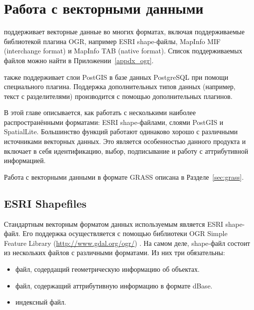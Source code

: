 
\chapter{Работа с векторными данными}\label{label_workingvector}


\qg поддерживает векторные данные во многих форматах, включая
поддерживаемые библиотекой плагина OGR, например ESRI shape-файлы,
MapInfo MIF (interchange format)
и MapInfo TAB (native format).
Список поддерживаемых файлов можно найти в Приложении~\ref{appdx_ogr}.

\qg также поддерживает слои PostGIS
в базе данных PostgreSQL при помощи специального плагина. Поддержка
дополнительных типов данных (например, текст с разделителями) производится
с помощью дополнительных плагинов.

В этой главе описывается, как работать с несколькими наиболее
распространёнными форматами: ESRI shape-файлами, слоями PostGIS и SpatialLite.
Большинство функций \qg работают одинаково хорошо с различными источниками
векторных данных. Это является особенностью данного продукта и включает
в себя идентификацию, выбор, подписывание и работу с аттрибутивной информацией.

Работа с векторными данными в формате GRASS описана в Разделе~\ref{sec:grass}.

\section{ESRI Shapefiles}

Стандартным векторным форматом данных используемым \qg является ESRI
shape-файл. Его поддержка осуществляется с помощью библиотеки OGR Simple
Feature Library (\url{http://www.gdal.org/ogr/})
. На самом деле, shape-файл состоит из нескольких файлов с
различными форматами. Из них три обязательны: 

\begin{itemize}[label=--]
\item {} файл, содердащий геометрическую информацию об объектах.
\item {} файл, содержащий аттрибутивную информацию в
формате dBase.
\item {} индексный файл.
\end{itemize}


